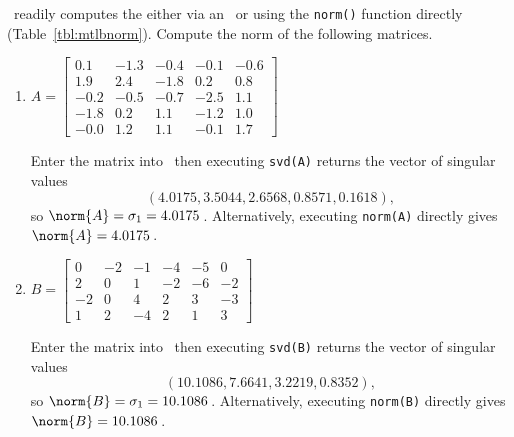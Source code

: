 \begin{example} \label{eg:}
\script\ readily computes the  either via an \svd\ or using the \verb|norm()| function directly (Table~\ref{tbl:mtlbnorm}).
Compute the norm of the following matrices.
\begin{enumerate}
\item \(A=\begin{bmatrix} 
   0.1&-1.3&-0.4&-0.1&-0.6\\
   1.9&2.4&-1.8&0.2&0.8\\
  -0.2&-0.5&-0.7&-2.5&1.1\\
  -1.8&0.2&1.1&-1.2&1.0\\
  -0.0&1.2&1.1&-0.1&1.7
 \end{bmatrix}\)
\begin{solution} 
Enter the matrix into \script\ then executing \verb|svd(A)| returns the vector of singular values
\setbox\ajrqrbox\hbox{}%
\marginpar{\usebox{\ajrqrbox\\[2ex]}}%
\begin{equation*}
(4.0175,3.5044,2.6568,0.8571,0.1618),
\end{equation*}
so \(\norm{A}=\sigma_1=4.0175\)\,.
Alternatively, executing \verb|norm(A)| directly gives  \(\norm{A}=4.0175\)\,.
\end{solution}

\item \(B=\begin{bmatrix} 
0&-2&-1&-4&-5&0
\\2&0&1&-2&-6&-2
\\-2&0&4&2&3&-3
\\1&2&-4&2&1&3
\end{bmatrix}\)
\begin{solution} 
Enter the matrix into \script\ then executing \verb|svd(B)| returns the vector of singular values
\setbox\ajrqrbox\hbox{}%
\marginpar{\usebox{\ajrqrbox\\[2ex]}}%
\begin{equation*}
(10.1086,7.6641,3.2219,0.8352),
\end{equation*}
so \(\norm{B}=\sigma_1=10.1086\)\,.
Alternatively, executing \verb|norm(B)| directly gives  \(\norm{B}=10.1086\)\,.
\end{solution}

\end{enumerate}
\end{example}










